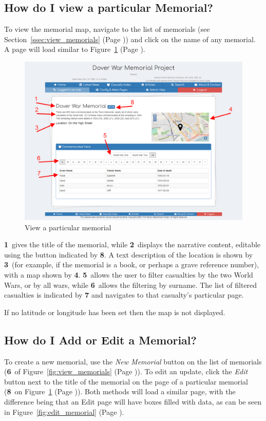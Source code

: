 \documentclass[12pt]{article}
\newcommand{\marker}[1]{\color{red}\textbf{#1}\color{black}}
\newcommand{\myref}[1]{\ref{#1} {\scriptsize(Page \pageref{#1})}}
\begin{document}
\newpage
\FloatBarrier
\subsection{How do I view a particular Memorial?}
To view the memorial map, navigate to the list of memorials (see Section~\myref{ssec:view_memorials}) and click on the name of any memorial. A page will load similar to Figure~\myref{fig:view_memorial}.

\begin{figure}[h]
  \centering
 \includegraphics[width=.9\textwidth]{pics/view_memorial.png}
	\caption{View a particular memorial}\label{fig:view_memorial}
\end{figure}

\marker{1}\ gives the title of the memorial, while \marker{2}\ displays the narrative content, editable using the button indicated by \marker{8}. A text description of the location is shown by \marker{3}\ (for example, if the memorial is a book, or perhaps a grave reference number), with a map shown by \marker{4}. \marker{5}\ allows the user to filter casualties by the two World Wars, or by all wars, while \marker{6}\ allows the filtering by surname. The list of filtered casualties is indicated by \marker{7} and navigates to that casualty's particular page.

\begin{infoBox}
If no latitude or longitude has been set then the map is not displayed.
\end{infoBox}

\newpage
\FloatBarrier
\subsection{How do I Add or Edit a Memorial?}\label{ssec:edit_memorial}
To create a new memorial, use the \textit{New Memorial} button on the list of memorials (\marker{6}\ of Figure~\myref{fig:view_memorials}). To edit an update, click the \textit{Edit} button next to the title of the memorial on the page of a particular memorial (\marker{8}\ on Figure~\myref{fig:view_memorial}). Both methods will load a similar page, with the difference being that an Edit page will have boxes filled with data, as can be seen in Figure~\myref{fig:edit_memorial}.
\end{document}
